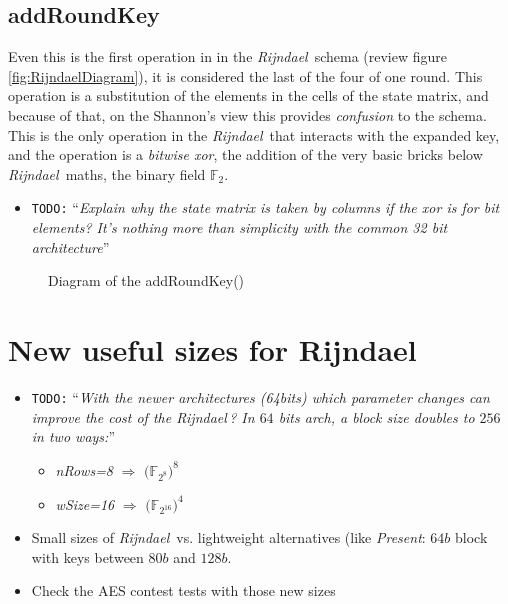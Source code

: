 \documentclass[10pt,a4paper,twoside]{llncs}
\newcommand{\todo}[1]{\texttt{\color{red}TODO:} ``\emph{#1}''}
\newcommand{\rijndael}{\emph{Rijndael}}
\newcommand{\Fq}[1]{\ensuremath{\mathbb{F}_#1}}
\newcommand{\Fpn}[2]{\ensuremath{\mathbb{F}_{#1^#2}}}
\begin{document}
\subsection{addRoundKey}\label{sec:addRoundKey}

Even this is the first operation in in the \rijndael\, schema (review figure \ref{fig:RijndaelDiagram}), it is considered the last of the four of one round. This operation is a substitution of the elements in the cells of the state matrix, and because of that, on the Shannon's view this provides \emph{confusion} to the schema. This is the only operation in the \rijndael\, that interacts with the expanded key, and the operation is a \emph{bitwise xor}, the addition of the very basic bricks below \rijndael\, maths, the binary field $\mathbb{F}_{2}$.

\begin{itemize}
 \item \todo{Explain why the state matrix is taken by columns if the \emph{xor} is for bit elements? It's nothing more than simplicity with the common 32 bit architecture}
\end{itemize}

\begin{figure}[ht]
\begin{center}

\caption{Diagram of the addRoundKey()}
\label{fig:addRoundKey}
\end{center}
\end{figure}


\section{New useful sizes for Rijndael}\label{sec:newSizes}
\begin{itemize}
    \item \todo{With the newer architectures (64bits) which parameter changes can improve the cost of the \rijndael\,? \cite{Daemen:1999:EBC:1267115.1267119} In $64$ bits arch, a block size doubles to $256$ in two ways:} 
    \begin{itemize}
        \item \emph{nRows=8} $\Rightarrow$ $($\Fpn{2}{8}$)^8$
        \item \emph{wSize=16} $\Rightarrow$ $($\Fpn{2}{{16}}$)^4$
    \end{itemize}
    \item Small sizes of \rijndael\, vs. lightweight alternatives (like \emph{Present}: $64b$ block with keys between $80b$ and $128b$.
    \item Check the AES contest tests with those new sizes
\end{itemize}
\end{document}
